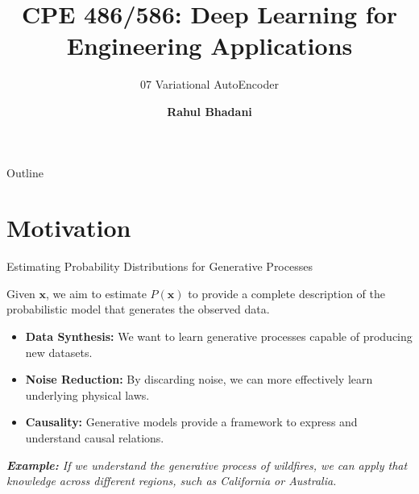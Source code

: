 \documentclass[aspectratio=169,xcolor=dvipsnames,svgnames,x11names,fleqn]{beamer}
\title[CPE 487/587: Deep Learning]{CPE 486/586: Deep Learning for Engineering Applications} %
\subtitle{07 Variational AutoEncoder}
\author[Rahul Bhadani] {{\Large \textbf{Rahul Bhadani}}}
\institute[UAH] %
{
    Electrical \& Computer Engineering,  The University of Alabama in Huntsville
}
\date
\begin{document}
\begin{frame}
    \titlepage
\end{frame}

\begin{frame}{Outline}
    \backgroundtableofcontents
\end{frame}

\section{Motivation}

\begin{frame}
    \sectionpage
\end{frame}


\begin{frame}{Estimating Probability Distributions for Generative Processes}
    
    \begin{tcolorbox}[colback=softblue, colframe=mainblue, arc=4pt, boxrule=1pt, left=10pt, right=10pt, top=8pt, bottom=8pt]
        \centering 
        Given $\mathbf{x}$, we aim to estimate $P(\mathbf{x})$ to provide a complete description of the probabilistic model that generates the observed data.
    \end{tcolorbox}

    \vspace{0.1cm}
\footnotesize

    \begin{itemize}
        \item \textbf{Data Synthesis:} We want to learn generative processes capable of producing new datasets.
        \item \textbf{Noise Reduction:} By discarding noise, we can more effectively learn underlying physical laws.
        \item \textbf{Causality:} Generative models provide a framework to express and understand causal relations.
    \end{itemize}

    \vspace{0.1cm}

    \begin{tcolorbox}[blanker, borderline west={2pt}{0pt}{gray!40}, left=10pt]
        \small \textit{\textbf{Example:} If we understand the generative process of wildfires, we can apply that knowledge across different regions, such as California or Australia.}
    \end{tcolorbox}




\end{frame}
\end{document}
